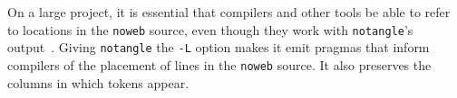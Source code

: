 % 
% 


On a large project, it is essential that compilers and other tools be
able to refer to locations in the \verb+noweb+ source, even though
they work with \verb+notangle+'s output~\cite{ramsey:literate}.
Giving \verb+notangle+ the  \verb+-L+ option makes it emit pragmas
that inform compilers of the placement of lines
in the \verb+noweb+ source.
It also preserves the columns in which
tokens appear.



